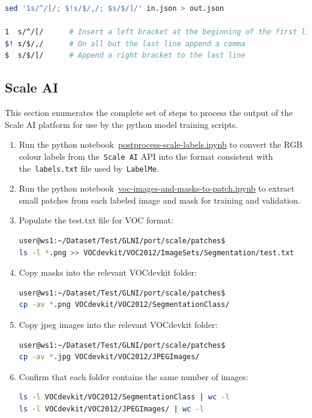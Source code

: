 \documentclass[11pt]{article} %
\begin{document}
\begin{lstlisting}[language=bash, frame=single]
sed '1s/^/[/; $!s/$/,/; $s/$/]/' in.json > out.json

1  s/^/[/      # Insert a left bracket at the beginning of the first line
$! s/$/,/      # On all but the last line append a comma
$  s/$/]/      # Append a right bracket to the last line
\end{lstlisting}

\subsection{Scale AI}

This section enumerates the complete set of steps to process the output of the 
Scale AI platform for use by the python model training scripts.

\begin{enumerate}
\item Run the python
notebook~\href{https://github.com/AngusG/cciw-zebra-mussel/blob/master/labelme/scale}{postprocess-scale-labels.ipynb}
to convert the RGB colour labels from the~\texttt{Scale AI} API into the format
consistent with the~\texttt{labels.txt} file used by~\texttt{LabelMe}.

\item Run the python
notebook~\href{https://github.com/AngusG/cciw-zebra-mussel/blob/master/labelme/voc-images-and-masks-to-patch.ipynb}{voc-images-and-masks-to-patch.ipynb}
to extract small patches from each labeled image and mask for training and
validation.

\item Populate the test.txt file for VOC format:

\begin{lstlisting}[language=bash, frame=single]
user@ws1:~/Dataset/Test/GLNI/port/scale/patches$ 
ls -l *.png >> VOCdevkit/VOC2012/ImageSets/Segmentation/test.txt
\end{lstlisting}

\item Copy masks into the relevant VOCdevkit folder:

\begin{lstlisting}[language=bash, frame=single]
user@ws1:~/Dataset/Test/GLNI/port/scale/patches$ 
cp -av *.png VOCdevkit/VOC2012/SegmentationClass/
\end{lstlisting}

\item Copy jpeg images into the relevant VOCdevkit folder:

\begin{lstlisting}[language=bash, frame=single]
user@ws1:~/Dataset/Test/GLNI/port/scale/patches$ 
cp -av *.jpg VOCdevkit/VOC2012/JPEGImages/
\end{lstlisting}

\item Confirm that each folder contains the same number of images:
\begin{lstlisting}[language=bash, frame=single]
ls -l VOCdevkit/VOC2012/SegmentationClass | wc -l
ls -l VOCdevkit/VOC2012/JPEGImages/ | wc -l
\end{lstlisting}

\end{enumerate}
\end{document}
